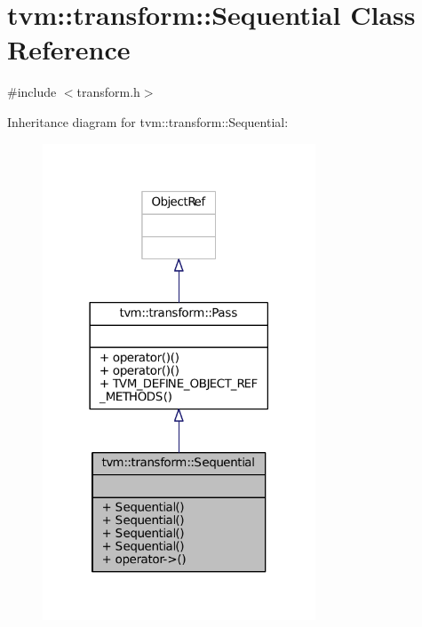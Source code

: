 \hypertarget{classtvm_1_1transform_1_1Sequential}{}\section{tvm\+:\+:transform\+:\+:Sequential Class Reference}
\label{classtvm_1_1transform_1_1Sequential}


{\ttfamily \#include $<$transform.\+h$>$}



Inheritance diagram for tvm\+:\+:transform\+:\+:Sequential\+:
\nopagebreak
\begin{figure}[H]
\begin{center}
\leavevmode
\includegraphics[width=230pt]{classtvm_1_1transform_1_1Sequential__inherit__graph}
\end{center}
\end{figure}


